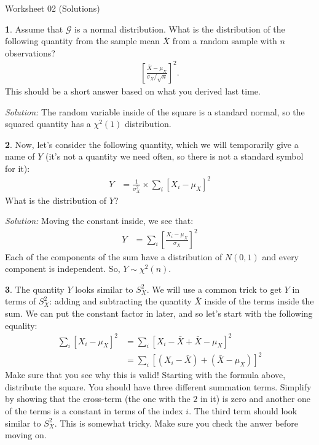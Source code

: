 \documentclass{tufte-handout}
\begin{document}
\justify

{\LARGE Worksheet 02 (Solutions)}

\vspace*{18pt}


\textbf{1}. Assume that $\mathcal{G}$ is a normal distribution. What is the distribution
of the following quantity from the sample mean $\bar{X}$ from a random sample
with $n$ observations?
\begin{align*}
\left[\frac{\bar{X} - \mu_X}{\sigma_X / \sqrt{n}} \right]^2.
\end{align*}
This should be a short answer based on what you derived last time.

\textit{Solution:} The random variable inside of the square is a standard normal, so
the squared quantity has a $\chi^2(1)$ distribution.

\textbf{2}. Now, let's consider the following quantity, which we will temporarily
give a name of $Y$ (it's not a quantity we need often, so there is not
a standard symbol for it):
\begin{align*}
Y &= \frac{1}{\sigma_X^2} \times \sum_i \left[ X_i - \mu_X \right]^2 
\end{align*}
What is the distribution of $Y$?

\textit{Solution:} Moving the constant inside, we see that:
\begin{align*}
Y &=  \sum_i \left[ \frac{X_i - \mu_X}{\sigma_X} \right]^2 
\end{align*}
Each of the components of the sum have a distribution of $N(0, 1)$ and
every component is independent. So, $Y \sim \chi^2(n)$.

\textbf{3}. The quantity $Y$ looks similar to $S_X^2$. We will use a common trick to
get $Y$ in terms of $S_X^2$: adding and subtracting the quantity $\bar{X}$
inside of the terms inside the sum. We can put the constant factor in later,
and so let's start with the following equality:
\begin{align*}
\sum_i \left[ X_i - \mu_X \right]^2 &= \sum_i \left[ X_i - \bar{X} + \bar{X} - \mu_X \right]^2  \\
&= \sum_i \left[ (X_i - \bar{X}) + (\bar{X} - \mu_X) \right]^2 
\end{align*}
Make sure that you see why this is valid! Starting with the
formula above, distribute the square. You should have three different summation
terms. Simplify by showing that the cross-term (the one with the $2$ in it) is
zero and another one of the terms is a constant in terms of the index $i$. The
third term should look similar to $S_X^2$. This is somewhat tricky. Make sure
you check the anwer before moving on.
\end{document}
